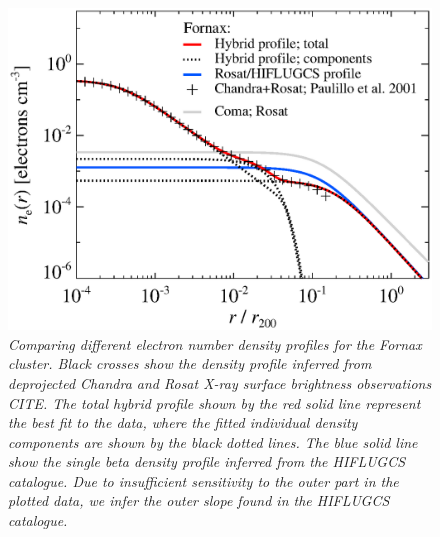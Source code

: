 \documentclass[10pt,aps,pra,reprint,amsmath,amsfonts,amssymb,showpacs]{revtex4-1}
\begin{document}
\begin{figure}%
 \includegraphics[width=0.99\columnwidth]{figures/dens.fornax.eps}
\caption{\it Comparing different electron number density profiles for
  the Fornax cluster. Black crosses show the density profile inferred
  from deprojected Chandra and Rosat X-ray surface brightness
  observations CITE. The total hybrid profile shown by the red solid
  line represent the best fit to the data, where the fitted individual
  density components are shown by the black dotted lines. The blue
  solid line show the single beta density profile inferred from the
  HIFLUGCS catalogue. Due to insufficient sensitivity to the outer part
  in the plotted data, we infer the outer slope found in the HIFLUGCS
  catalogue.}
 \label{fig:dens_fornax}
\end{figure}
\end{document}
